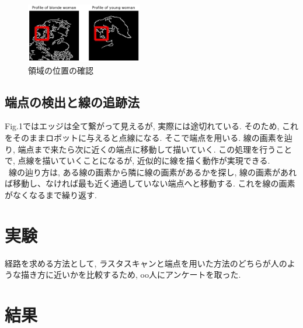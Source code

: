 \documentclass[10pt]{jarticle}
\begin{document}
    \begin{center}
        \begin{figure}[h]
            \includegraphics[width=0.45\textwidth]{img/003.png}
            \caption{領域の位置の確認}
            \label{the position of a region}
        \end{figure}
    \end{center}
	

	\subsection{端点の検出と線の追跡法}
	Fig.1ではエッジは全て繋がって見えるが, 実際には途切れている. そのため, これをそのままロボットに与えると点線になる.
	そこで端点を用いる.
	線の画素を辿り, 端点まで来たら次に近くの端点に移動して描いていく.
	この処理を行うことで, 点線を描いていくことになるが, 近似的に線を描く動作が実現できる.
  \\\  
	線の辿り方は, ある線の画素から隣に線の画素があるかを探し, 線の画素があれば移動し、なければ最も近く通過していない端点へと移動する.
	これを線の画素がなくなるまで繰り返す.
	


	\section{実験}

	経路を求める方法として, ラスタスキャンと端点を用いた方法のどちらが人のような描き方に近いかを比較するため, oo人にアンケートを取った.

	\section{結果}
	
\end{document}

